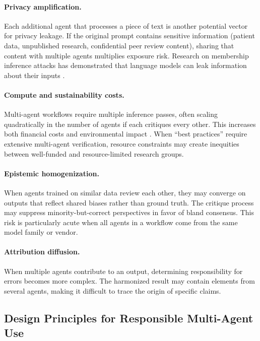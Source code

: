 \documentclass[11pt,letterpaper]{article}
\begin{document}
\paragraph{Privacy amplification.} Each additional agent that processes a piece of text is another potential vector for privacy leakage. If the original prompt contains sensitive information (patient data, unpublished research, confidential peer review content), sharing that content with multiple agents multiplies exposure risk. Research on membership inference attacks has demonstrated that language models can leak information about their inputs \cite{shokri2017,carlini2021}.

\paragraph{Compute and sustainability costs.} Multi-agent workflows require multiple inference passes, often scaling quadratically in the number of agents if each critiques every other. This increases both financial costs and environmental impact \cite{strubell2019,patterson2021}. When ``best practices'' require extensive multi-agent verification, resource constraints may create inequities between well-funded and resource-limited research groups.

\paragraph{Epistemic homogenization.} When agents trained on similar data review each other, they may converge on outputs that reflect shared biases rather than ground truth. The critique process may suppress minority-but-correct perspectives in favor of bland consensus. This risk is particularly acute when all agents in a workflow come from the same model family or vendor.

\paragraph{Attribution diffusion.} When multiple agents contribute to an output, determining responsibility for errors becomes more complex. The harmonized result may contain elements from several agents, making it difficult to trace the origin of specific claims.

\subsection{Design Principles for Responsible Multi-Agent Use}
\end{document}
